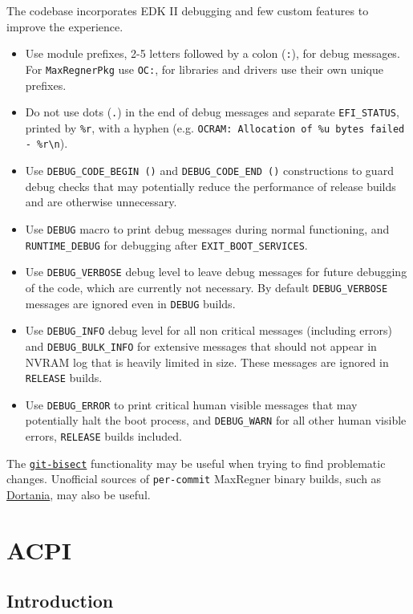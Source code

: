 \documentclass[]{article}
\makeatletter
\providecommand{\tightlist}{%
  \setlength{\itemsep}{0pt}\setlength{\parskip}{0pt}}
\renewcommand{\label}[1]{%
\zref@wrapper@immediate{\oldlabel{#1}}}  %
\makeatother
\begin{document}
The codebase incorporates EDK II debugging and few custom features to improve the experience.
\begin{itemize}
\tightlist
\item Use module prefixes, 2-5 letters followed by a colon (\texttt{:}), for debug messages. For \texttt{MaxRegnerPkg}
use \texttt{OC:}, for libraries and drivers use their own unique prefixes.
\item Do not use dots (\texttt{.}) in the end of debug messages and separate \texttt{EFI\_STATUS}, printed by
\texttt{\%r}, with a hyphen (e.g. \texttt{OCRAM: Allocation of \%u bytes failed - \%r\textbackslash n}).
\item Use \texttt{DEBUG\_CODE\_BEGIN ()} and \texttt{DEBUG\_CODE\_END ()} constructions to guard debug checks
that may potentially reduce the performance of release builds and are otherwise unnecessary.
\item Use \texttt{DEBUG} macro to print debug messages during normal functioning, and \texttt{RUNTIME\_DEBUG} for
debugging after \texttt{EXIT\_BOOT\_SERVICES}.
\item Use \texttt{DEBUG\_VERBOSE} debug level to leave debug messages for future debugging of the code, which
are currently not necessary. By default \texttt{DEBUG\_VERBOSE} messages are ignored even in \texttt{DEBUG} builds.
\item Use \texttt{DEBUG\_INFO} debug level for all non critical messages (including errors)
and \texttt{DEBUG\_BULK\_INFO}
for extensive messages that should not appear in NVRAM log that is heavily limited in size.
These messages are ignored in \texttt{RELEASE} builds.
\item Use \texttt{DEBUG\_ERROR} to print critical human visible messages that may potentially halt the boot process,
and \texttt{DEBUG\_WARN} for all other human visible errors, \texttt{RELEASE} builds included.
\end{itemize}

The \href{https://git-scm.com/docs/git-bisect}{\texttt{git-bisect}} functionality may be useful when trying
to find problematic changes. Unofficial sources of \texttt{per-commit} MaxRegner binary builds,
such as \href{https://dortania.github.io/builds}{Dortania}, may also be useful.

\section{ACPI}\label{acpi}

\subsection{Introduction}\label{acpiintro}
\end{document}
